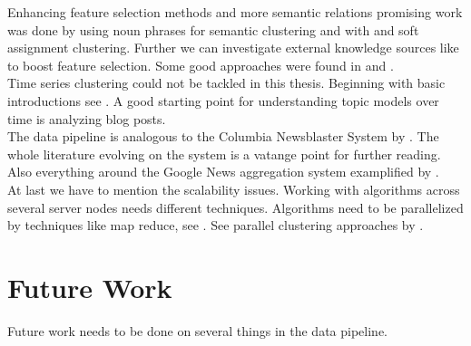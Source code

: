 Enhancing feature selection methods and more semantic relations promising work was done by \cite{NounPhraseSemanticClustering@2009@Zheng} using noun phrases for semantic clustering and 
\cite{WordNetAndFuzzyAssociation@2010@Chen} with \wordnet{} and soft assignment clustering. Further we can investigate external knowledge sources like \wiki{} to boost feature selection. Some good approaches were found in \cite{WikipediaClusteringSim2009} and \cite{WikipediaClustering2010}.\\

Time series clustering could not be tackled in this thesis. Beginning with basic introductions see \cite{ClusteringTimesSeriesSurves2005, RecentTechniquesClusteringSurvey2012, IncrementalClustering2012}. A good starting point for understanding topic models over time is \cite{BlogTopicLDA2013} analyzing blog posts.\\

The data pipeline is analogous to the Columbia Newsblaster System by \cite{NewsBlaster2002}. The whole literature evolving on the system is a vatange point for further reading. Also everything around the Google News aggregation system examplified by \cite{GoogleNews2007}.\\

At last we have to mention the scalability issues. Working with algorithms across several server nodes needs different techniques. Algorithms need to be parallelized by techniques like map reduce, see \cite{MapReduce2008}. See parallel clustering approaches by \cite{ParallelClustering2009}.

\section{Future Work}
\label{sec:future_work}
Future work needs to be done on several things in the data pipeline.

